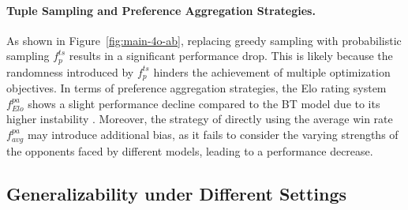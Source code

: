 \paragraph{Tuple Sampling and Preference Aggregation Strategies.} 
As shown in Figure~\ref{fig:main-4o-ab}, replacing greedy sampling with probabilistic sampling $f^{ts}_p$ results in a significant performance drop. This is likely because the randomness introduced by $f^{ts}_p$ hinders the achievement of multiple optimization objectives. In terms of preference aggregation strategies, the Elo rating system $f^{pa}_{Elo}$ shows a slight performance decline compared to the BT model due to its higher instability \citep{eloun}. Moreover, the strategy of directly using the average win rate $f^{pa}_{avg}$ may introduce additional bias, as it fails to consider the varying strengths of the opponents faced by different models, leading to a performance decrease.


\subsection{Generalizability under Different Settings}
\label{sec:exp-3}
